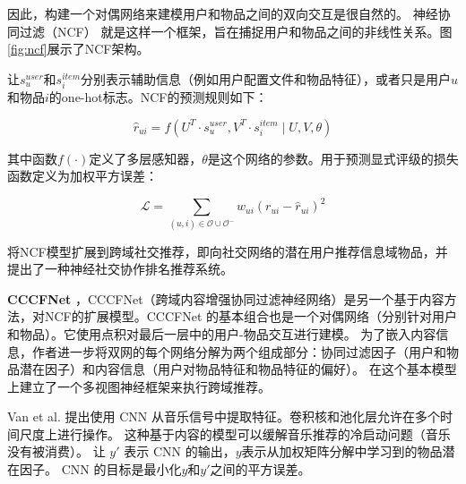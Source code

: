 \documentclass[sigconf]{acmart}
\begin{document}
因此，构建一个对偶网络来建模用户和物品之间的双向交互是很自然的。 神经协同过滤（NCF）\cite{he2017neural} 就是这样一个框架，旨在捕捉用户和物品之间的非线性关系。图\ref{fig:ncf}展示了NCF架构。

让$s_u^{user}$和$s_i^{item}$分别表示辅助信息（例如用户配置文件和物品特征），或者只是用户$u$和物品$i$的one-hot标志。NCF的预测规则如下：

\begin{equation}
  \hat{r}_{u i}=f\left(U^{T} \cdot s_{u}^{u s e r}, V^{T} \cdot s_{i}^{i t e m} \mid U, V, \theta\right)
\end{equation}

其中函数$f(\cdot)$定义了多层感知器，$\theta$是这个网络的参数。用于预测显式评级的损失函数定义为加权平方误差：

\begin{equation}
  \mathcal{L}=\sum_{(u, i) \in \mathcal{O} \cup \mathcal{O}^{-}} w_{u i}\left(r_{u i}-\hat{r}_{u i}\right)^2
\end{equation}

\cite{wang2017item}将NCF模型扩展到跨域社交推荐，即向社交网络的潜在用户推荐信息域物品，并提出了一种神经社交协作排名推荐系统。

\textbf{CCCFNet} \cite{lian2017cccfnet} ，CCCFNet（跨域内容增强协同过滤神经网络）是另一个基于内容方法，对NCF的扩展模型。CCCFNet 的基本组合也是一个对偶网络（分别针对用户和物品）。它使用点积对最后一层中的用户-物品交互进行建模。 为了嵌入内容信息，作者进一步将双网的每个网络分解为两个组成部分：协同过滤因子（用户和物品潜在因子）和内容信息（用户对物品特征和物品特征的偏好）。 在这个基本模型上建立了一个多视图神经框架来执行跨域推荐。

Van et al. \cite{van2013deep} 提出使用 CNN 从音乐信号中提取特征。卷积核和池化层允许在多个时间尺度上进行操作。 这种基于内容的模型可以缓解音乐推荐的冷启动问题（音乐没有被消费）。 让 $y'$ 表示 CNN 的输出，$y$表示从加权矩阵分解中学习到的物品潜在因子。 CNN 的目标是最小化$y$和$y'$之间的平方误差。 





  
\end{document}
